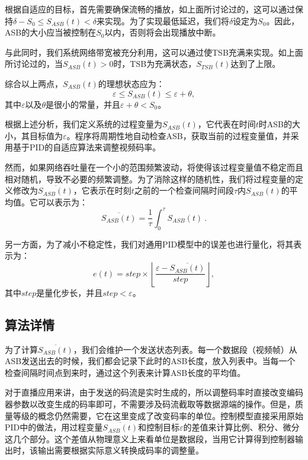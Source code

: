 根据自适应的目标，首先需要确保流畅的播放，如上面所讨论过的，这可以通过保持$\delta - S_0 \le S_{ASB}(t) < \delta$来实现。为了实现最低延迟，我们将$\delta$设定为$S_0$。因此，ASB的大小应当被控制在$S_0$以内，否则将会出现播放中断。

与此同时，我们系统网络带宽被充分利用，这可以通过使TSB充满来实现。如上面所讨论过的，当$S_{ASB}(t)>0$时，TSB为充满状态，$S_{TSB}(t)$达到了上限。

综合以上两点，$S_{ASB}(t)$的理想状态应为：
\begin{equation}
\varepsilon \le S_{ASB}(t) \le \varepsilon+\theta,
\end{equation}
其中$\varepsilon$以及$\theta$是很小的常量，并且$\varepsilon+\theta<S_0$。

根据上述分析，我们定义系统的过程变量为$S_{ASB}(t)$，它代表在时间$t$时ASB的大小，其目标值为$\varepsilon$。程序将周期性地自动检查ASB，获取当前的过程变量值，并采用基于PID的自适应算法来调整视频码率。

然而，如果网络吞吐量在一个小的范围频繁波动，将使得该过程变量值不稳定而且相对随机，导致不必要的频繁调整。为了消除这样的随机性，我们将过程变量的定义修改为$\overline{S_{ASB}(t)}$，它表示在时刻$t$之前的一个检查间隔时间段$\tau$内$S_{ASB}(t)$的平均值。它可以表示为：
\begin{equation}
\label{eq:asb}
\overline{S_{ASB}(t)} = \dfrac{1}{\tau} \int_0^\tau {S_{ASB}(t)}\: .
\end{equation}

另一方面，为了减小不稳定性，我们对通用PID模型中的误差也进行量化，将其表示为：
\begin{equation}
e(t) = step \times \left \lfloor\dfrac{\varepsilon - \overline{S_{ASB}(t)}}{step} \right \rfloor,
\end{equation}
其中$step$是量化步长，并且$step<\varepsilon$。

\subsection{算法详情}

为了计算$\overline{S_{ASB}(t)}$，我们会维护一个发送状态列表。每一个数据段（视频帧）从ASB发送出去的时候，我们都会记录下此时的ASB长度，放入列表中。当每一个检查间隔时间点到来时，通过这个列表来计算ASB长度的平均值。

对于直播应用来讲，由于发送的码流是实时生成的，所以调整码率时直接改变编码器参数以改变生成的码率即可，不需要涉及码流截取等数据源端的操作。但是，质量等级的概念仍然需要，它在这里变成了改变码率的单位。控制模型直接采用原始PID中的做法，用过程变量$\overline{S_{ASB}(t)}$和控制目标$\varepsilon$的差值来计算比例、积分、微分这几个部分。这个差值从物理意义上来看单位是数据段，当用它计算得到控制器输出时，该输出需要根据实际意义转换成码率的调整量。

